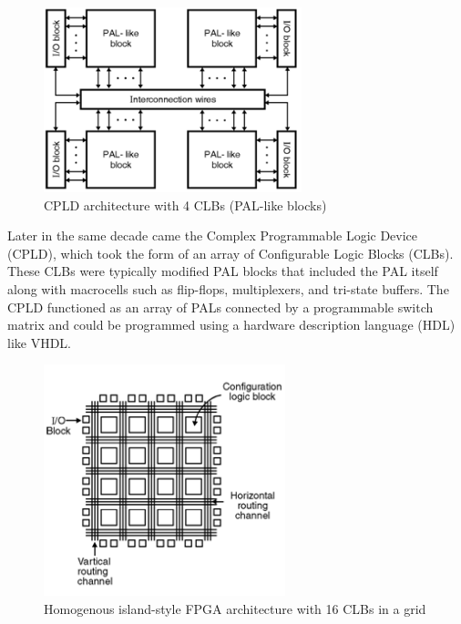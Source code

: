 \documentclass[twocolumn]{article}
\begin{document}
    \begin{figure}
        \centering
        \includegraphics[width=7.5cm]{figures/cpld.png}
        \caption{CPLD architecture with 4 CLBs (PAL-like blocks)}
        \label{fig:cpld}
    \end{figure}

    Later in the same decade came the Complex Programmable Logic Device (CPLD), which took the form of an array of Configurable Logic Blocks (CLBs). 
    These CLBs were typically modified PAL blocks that included the PAL itself along with macrocells such as flip-flops, multiplexers, and tri-state buffers. 
    The CPLD functioned as an array of PALs connected by a programmable switch matrix and could be programmed using a hardware description language (HDL) like VHDL. 

    \begin{figure}
        \centering
        \includegraphics[width=7.0cm]{figures/fpga.png}
        \caption{Homogenous island-style FPGA architecture with 16 CLBs in a grid}
        \label{fig:fpga}
    \end{figure}
\end{document}
